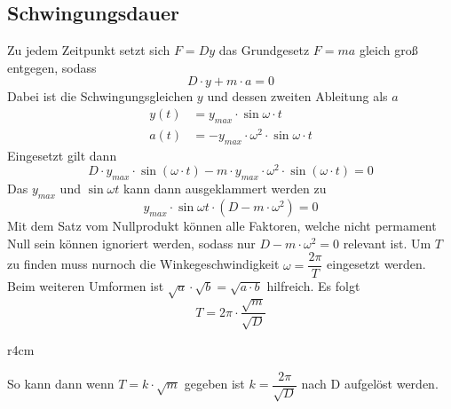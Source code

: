 \documentclass{article}
\begin{document}
\subsection{Schwingungsdauer}
Zu jedem Zeitpunkt setzt sich $F=Dy$ das Grundgesetz $F=ma$ gleich groß entgegen, sodass
\begin{equation}
 D \cdot y + m \cdot a = 0
\end{equation}
Dabei ist die Schwingungsgleichen $y$ und dessen zweiten Ableitung als $a$
\begin{align}
y(t)&=y_{max} \cdot \sin{\omega \cdot t} \\
a(t)&=-y_{max} \cdot \omega^2 \cdot \sin{\omega \cdot t}
\end{align} 
Eingesetzt gilt dann 
\begin{equation}
 D \cdot y_{max} \cdot \sin{(\omega \cdot t)} - m \cdot y_{max} \cdot \omega^2 \cdot \sin{(\omega \cdot t)} = 0
\end{equation} 
Das $y_{max}$ und $\sin{\omega t}$ kann dann ausgeklammert werden zu \begin{equation}
 y_{max} \cdot \sin{\omega t} \cdot (D - m \cdot \omega^2) = 0 
\end{equation} 
Mit dem Satz vom Nullprodukt können alle Faktoren, welche nicht permament Null sein können ignoriert werden, sodass nur $D - m \cdot \omega^2 = 0$ relevant ist. \newline
Um $T$ zu finden muss nurnoch die Winkegeschwindigkeit $\omega = \dfrac{2\pi}{T}$ eingesetzt werden. Beim weiteren Umformen ist $\sqrt{a}\cdot\sqrt{b}=\sqrt{a \cdot b}$ hilfreich. 
Es folgt
\begin{equation}
 T = 2\pi \cdot \frac{\sqrt{m}}{\sqrt{D}}
\end{equation}  
\begin{wrapfigure}{r}{4cm}
 \centering 
\end{wrapfigure} 
So kann dann wenn $T=k \cdot \sqrt{m}$ gegeben ist $k=\dfrac{2\pi}{\sqrt{D}}$ nach D aufgelöst werden.  
\end{document}
